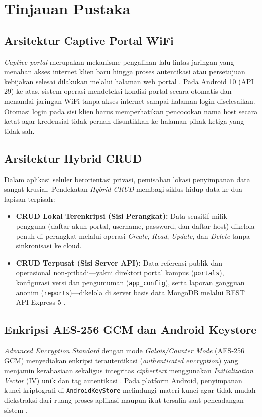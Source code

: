 \chapter{Tinjauan Pustaka}

\section{Arsitektur Captive Portal WiFi}
\textit{Captive portal} merupakan mekanisme pengalihan lalu lintas jaringan yang menahan akses internet klien baru hingga proses autentikasi atau persetujuan kebijakan selesai dilakukan melalui halaman web portal \cite{rfc8952}. Pada Android 10 (API 29) ke atas, sistem operasi mendeteksi kondisi portal secara otomatis dan menandai jaringan WiFi tanpa akses internet sampai halaman login diselesaikan. Otomasi login pada sisi klien harus memperhatikan pencocokan nama host secara ketat agar kredensial tidak pernah disuntikkan ke halaman pihak ketiga yang tidak sah.

\section{Arsitektur Hybrid CRUD}
Dalam aplikasi seluler berorientasi privasi, pemisahan lokasi penyimpanan data sangat krusial. Pendekatan \textit{Hybrid CRUD} membagi siklus hidup data ke dua lapisan terpisah:
\begin{itemize}[leftmargin=*]
  \item \textbf{CRUD Lokal Terenkripsi (Sisi Perangkat):} Data sensitif milik pengguna (daftar akun portal, username, password, dan daftar host) dikelola penuh di perangkat melalui operasi \textit{Create}, \textit{Read}, \textit{Update}, dan \textit{Delete} tanpa sinkronisasi ke cloud.
  \item \textbf{CRUD Terpusat (Sisi Server API):} Data referensi publik dan operasional non-pribadi—yakni direktori portal kampus (\texttt{portals}), konfigurasi versi dan pengumuman (\texttt{app\_config}), serta laporan gangguan anonim (\texttt{reports})—dikelola di server basis data MongoDB \cite{mongodb_node} melalui REST API Express 5 \cite{express_docs}.
\end{itemize}

\section{Enkripsi AES-256 GCM dan Android Keystore}
\textit{Advanced Encryption Standard} dengan mode \textit{Galois/Counter Mode} (AES-256 GCM) menyediakan enkripsi terautentikasi (\textit{authenticated encryption}) yang menjamin kerahasiaan sekaligus integritas \textit{ciphertext} menggunakan \textit{Initialization Vector} (IV) unik dan tag autentikasi \cite{nist_gcm}. Pada platform Android, penyimpanan kunci kriptografi di \texttt{AndroidKeyStore} melindungi materi kunci agar tidak mudah diekstraksi dari ruang proses aplikasi maupun ikut tersalin saat pencadangan sistem \cite{android_keystore}.

